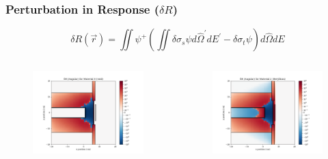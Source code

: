 \documentclass[t]{beamer}
\begin{document}
\begin{frame}
  \frametitle{Perturbation in Response ($\delta R$)}
  \vskip-0.25in
  \begin{equation}
    \delta R\left(\vec{r}\right) = \iint\psi^+\left(\iint\delta\sigma_s\psi d\hat{\Omega}^\prime dE^\prime - \delta\sigma_t\psi\right)d\hat{\Omega}dE
  \end{equation}
  \vskip-0.25in
  \begin{columns}
    \begin{figure}
      \includegraphics[trim={0.7in 0.15in 1.05in 0.4in},clip,scale=0.36]{images/dR_angular_00.png}
    \end{figure}
    \begin{figure}
      \includegraphics[trim={0.7in 0.15in 1.05in 0.4in},clip,scale=0.36]{images/dR_angular_02.png}

\end{figure}
\end{columns}
\end{frame}
\end{document}
